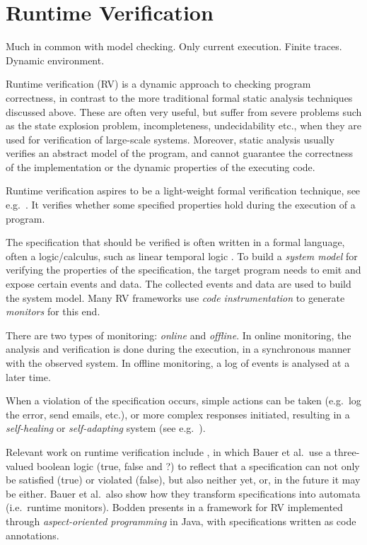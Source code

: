 \documentclass[a4paper,11pt]{kth-mag}
\begin{document}
\section{Runtime Verification} \label{section-rv}

Much in common with model checking. Only current execution. Finite traces.
Dynamic environment.

Runtime verification (RV) is a dynamic approach to checking program
correctness, in contrast to the more traditional formal static analysis
techniques discussed above. These are often very useful, but suffer from severe
problems such as the state explosion problem, incompleteness, undecidability
etc., when they are used for verification of large-scale systems.  Moreover,
static analysis usually verifies an abstract model of the program, and cannot
guarantee the correctness of the implementation or the dynamic properties of
the executing code.

Runtime verification aspires to be a light-weight formal verification
technique, see e.g.\ \cite{leucker09abriefaccount,delgado04taxonomy}. It
verifies whether some specified properties hold during the execution of a
program.

The specification that should be verified is often written in a formal
language, often a logic/calculus, such as linear temporal logic
\cite{pnueli77}. To build a \emph{system model} for verifying the properties of
the specification, the target program needs to emit and expose certain events
and data. The collected events and data are used to build the system model.
Many RV frameworks use \textit{code instrumentation} to generate
\textit{monitors} for this end.

There are two types of monitoring: \emph{online} and \emph{offline}. In online
monitoring, the analysis and verification is done during the execution, in a
synchronous manner with the observed system. In offline monitoring, a log of
events is analysed at a later time.

When a violation of the specification occurs, simple actions can be taken
(e.g.\ log the error, send emails, etc.), or more complex responses initiated,
resulting in a \textit{self-healing} or \textit{self-adapting} system (see
e.g.\ \cite{huebscher08survey}).

Relevant work on runtime verification include \cite{bauer06monitoring}, in
which Bauer et al.\ use a three-valued boolean logic (true, false and ?) to
reflect that a specification can not only be satisfied (true) or violated
(false), but also neither yet, or, in the future it may be either. Bauer et
al.\ also show how they transform specifications into automata (i.e.\ runtime
monitors). Bodden presents in \cite{bodden05efficientrv} a framework for RV
implemented through \emph{aspect-oriented programming} \cite{aspectj} in Java,
with specifications written as code annotations.
\end{document}
